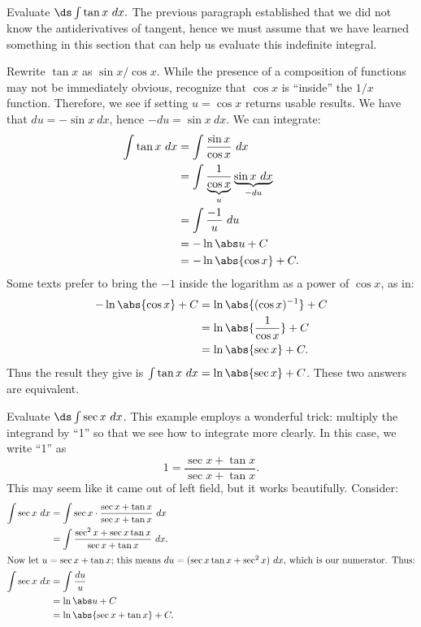 \begin{example}\label{ex_sub6}
Evaluate $\ds \int \tan x\ dx.$
\solution
The previous paragraph established that we did not know the antiderivatives of tangent, hence we must assume that we have learned something in this section that  can help us evaluate this indefinite integral. 

Rewrite $\tan x$ as $\sin x/\cos x$. While the presence of a composition of functions may not be immediately obvious, recognize that $\cos x$ is ``inside'' the $1/x$ function. Therefore, we see if setting $u = \cos x$ returns usable results. We have that $du = -\sin x\ dx$, hence $-du = \sin x\ dx$. We can integrate:
\begin{align*}
	\int \tan x \ dx
	&= \int \frac{\sin x}{\cos x}\ dx \\
	&= \int \frac1{\underbrace{\cos x}_u}\underbrace{\sin x\ dx}_{-du} \\
	&= \int \frac {-1}u \ du\\
	&= -\ln \abs u + C \\
	&= -\ln \abs{\cos x} + C.
\end{align*}
Some texts prefer to bring the $-1$ inside the logarithm as a power of $\cos x$, as in:
\begin{align*}
	-\ln\abs{\cos x} + C
	&= \ln\abs{(\cos x)^{-1}} + C\\
	&= \ln \abs{\frac{1}{\cos x}} + C\\
	&= \ln \abs{\sec x} + C.
\end{align*}
Thus the result they give is $\int \tan x \ dx = \ln\abs{\sec x}+C$. These two answers are equivalent.
\end{example}

\begin{example}\label{ex_sub7}
Evaluate $\ds\int \sec x\ dx$.
\solution
This example employs a wonderful trick: multiply the integrand by ``1'' so that we see how to integrate more clearly. In this case, we write ``1'' as
\[1 = \frac{\sec x + \tan x}{\sec x + \tan x}.\]
This may seem like it came out of left field, but it works beautifully. Consider:
\begin{align*}
	\int \sec x\ dx
	&= \int \sec x\cdot \frac{\sec x + \tan x}{\sec x + \tan x}\ dx \\
	&= \int \frac{\sec^2 x + \sec x\tan x}{\sec x + \tan x}\ dx.\\
\intertext{Now let $u = \sec x+\tan x$; this means $du = (\sec x\tan x+ \sec^2 x)\ dx$, which is our numerator. Thus:}
	\int \sec x\ dx
	&= \int \frac{du}{u} \\
	&= \ln \abs u + C \\
	&= \ln \abs{\sec x+\tan x} + C.
\end{align*}
\end{example}

